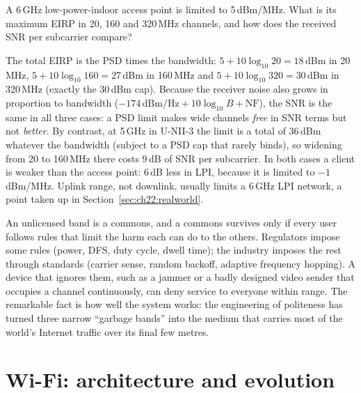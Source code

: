 \begin{worked}
A 6\,GHz low-power-indoor access point is limited to 5\,dBm/MHz. What is its maximum EIRP in 20,
160 and 320\,MHz channels, and how does the received SNR per subcarrier compare?

The total EIRP is the PSD times the bandwidth: $5+10\log_{10}20=18$\,dBm in 20\,MHz,
$5+10\log_{10}160=27$\,dBm in 160\,MHz and $5+10\log_{10}320=30$\,dBm in 320\,MHz (exactly the
30\,dBm cap). Because the receiver noise also grows in proportion to bandwidth
($-174\,\text{dBm/Hz}+10\log_{10}B+\text{NF}$), the SNR is the same in all three cases: a PSD limit
makes wide channels \emph{free} in SNR terms but not \emph{better}. By contrast, at 5\,GHz in
U-NII-3 the limit is a total of 36\,dBm whatever the bandwidth (subject to a PSD cap that rarely
binds), so widening from 20 to 160\,MHz there costs 9\,dB of SNR per subcarrier. In both cases a
client is weaker than the access point: 6\,dB less in LPI, because it is limited to
$-1$\,dBm/MHz. Uplink range, not downlink, usually limits a 6\,GHz LPI network, a point taken up in
Section~\ref{sec:ch22:realworld}.
\end{worked}

\begin{keyidea}
An unlicensed band is a commons, and a commons survives only if every user follows rules that
limit the harm each can do to the others. Regulators impose some rules (power, DFS, duty cycle,
dwell time); the industry imposes the rest through standards (carrier sense, random backoff,
adaptive frequency hopping). A device that ignores them, such as a jammer or a badly designed
video sender that occupies a channel continuously, can deny service to everyone within range. The
remarkable fact is how well the system works: the engineering of politeness has turned three
narrow ``garbage bands'' into the medium that carries most of the world's Internet traffic over
its final few metres.
\end{keyidea}

\section{Wi-Fi: architecture and evolution}
\label{sec:ch22:arch}

